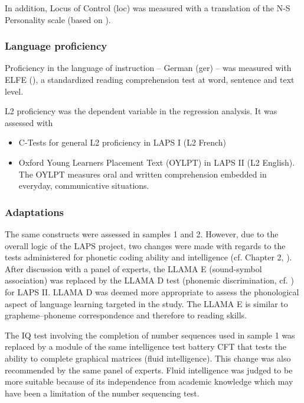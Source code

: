 \documentclass[output=paper]{langsci/langscibook}
\begin{document}
In addition, Locus of Control (loc) was measured with a translation of the N-S Personality scale (based on \citealt{NowickiStrickland1973}).

\subsubsection{Language proficiency}

Proficiency in the language of instruction – German (ger) – was measured with ELFE (\citealt{LenhardSchneider2006}), a standardized reading comprehension test at word, sentence and text level.

L2 proficiency was the dependent variable in the regression analysis. It was assessed with 

\begin{itemize}
\item C-Tests for general L2 proficiency in LAPS I (L2 French)
\item Oxford Young Learners Placement Text (OYLPT) \citep{Testing2013} in LAPS II (L2 English). The OYLPT measures oral and written comprehension embedded in everyday, communicative situations.
\end{itemize}

\subsubsection{Adaptations}\label{sec:03:2.2.5}

The same constructs were assessed in samples 1 and 2. However, due to the overall logic of the LAPS project, two changes were made with regards to the tests administered for phonetic coding ability and intelligence (cf. Chapter 2, ). After discussion with a panel of experts, the LLAMA E (sound-symbol association) was replaced by the LLAMA D test (phonemic discrimination, cf. \citealt{MearaEtAl2001}) for LAPS II. LLAMA D was deemed more appropriate to assess the phonological aspect of language learning targeted in the study. The LLAMA E is similar to grapheme–phoneme correspondence and therefore to reading skills.

The IQ test involving the completion of number sequences used in sample 1 was replaced by a module of the same intelligence test battery CFT \citep{Weiss2006} that tests the ability to complete graphical matrices (fluid intelligence). This change was also recommended by the same panel of experts. Fluid intelligence was judged to be more suitable because of its independence from academic knowledge which may have been a limitation of the number sequencing test. 
\end{document}
